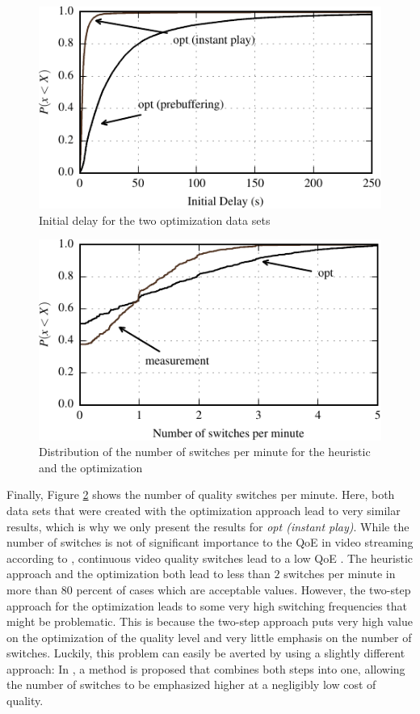 \begin{figure}[t]
\centering
\includegraphics[width=1.02\columnwidth]{figs/initial_delay_py}%
\caption{Initial delay for the two optimization data sets}
\label{fig:initial_delay}%
\end{figure}

\begin{figure}[t]
\centering
\includegraphics[width=\columnwidth]{figs/switches_py}%
\caption{Distribution of the number of switches per minute for the heuristic and the optimization}
\label{fig:switches}%
\end{figure}

Finally, Figure \ref{fig:switches} shows the number of quality switches per minute. Here, both data sets that were created with the optimization approach lead to very similar results, which is why we only present the results for \textit{opt (instant play)}. While the number of switches is not of significant importance to the QoE in video streaming according to \cite{seufert2015survey}, continuous video quality switches lead to a low QoE \cite{liu2013user}. The heuristic approach and the optimization both lead to less than $2$ switches per minute in more than $80$ percent of cases which are acceptable values. However, the two-step approach for the optimization leads to some very high switching frequencies that might be problematic. This is because the two-step approach puts very high value on the optimization of the quality level and very little emphasis on the number of switches. Luckily, this problem can easily be averted by using a slightly different approach: In \cite{liotou2016enriching}, a method is proposed that combines both steps into one, allowing the number of switches to be emphasized higher at a negligibly low cost of quality.

